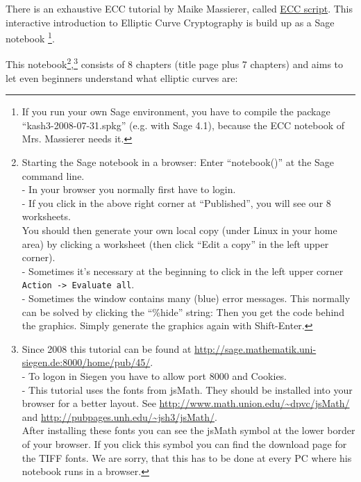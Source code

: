 There is an exhaustive ECC tutorial by Maike Massierer,
called \hyperlink{ec:Web-Link:Sage_Massierer}{ECC script}.
This interactive introduction to Elliptic Curve Cryptography is build up as
a Sage notebook%
\footnote{%
If you run your own Sage environment, you have to compile
the package ``kash3-2008-07-31.spkg'' (e.g. with Sage 4.1),
because the ECC notebook of Mrs. Massierer needs it.
}.

This notebook\footnote{%
Starting the Sage notebook in a browser: Enter ``notebook()'' at the Sage command line.\\
- In your browser you normally first have to login.\\
- If you click in the above right corner at ``Published'', you will see our 8 worksheets.\\
You should then generate your own local copy (under Linux in your home area) by clicking
a worksheet (then click ``Edit a copy'' in the left upper corner).\\
- Sometimes it's necessary at the beginning to click in the left upper corner
  \verb#Action -> Evaluate all#.\\
- Sometimes the window contains many (blue) error messages. This normally can be
solved by clicking the ``\%hide'' string: Then you get the code behind the
graphics. Simply generate the graphics again with Shift-Enter.
},\footnote{%
  Since 2008 this tutorial can be found at
    \url{http://sage.mathematik.uni-siegen.de:8000/home/pub/45/}.\\
  - To logon in Siegen you have to allow port 8000 and Cookies.\\
  - This tutorial uses the fonts from jsMath. They should be installed into your browser
    for a better layout.
    See \url{http://www.math.union.edu/~dpvc/jsMath/}
    and \url{http://pubpages.unh.edu/~jsh3/jsMath/}.\\
    After installing these fonts you can see the jsMath symbol at the lower border
    of your browser. If you click this symbol you can find the download page for the TIFF fonts.
    We are sorry, that this has to be done at every PC where his notebook runs in a browser.
}
consists of 8 chapters (title page plus 7 chapters)
and aims to let even beginners understand what elliptic curves are:

